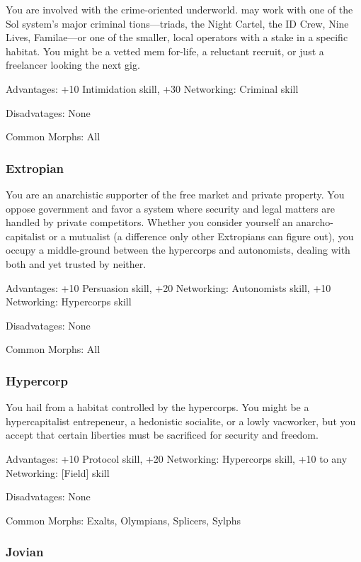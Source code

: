 You are involved with the crime-oriented underworld. may work with one of the Sol system’s major criminal tions—triads, the Night Cartel, the ID Crew, Nine Lives, Familae—or one of the smaller, local operators with a stake in a specific habitat. You might be a vetted mem for-life, a reluctant recruit, or just a freelancer looking the next gig.

Advantages: +10 Intimidation skill, +30 Networking: Criminal skill

Disadvatages: None

Common Morphs: All

\subsubsection{Extropian}
\label{sec:extropian}

You are an anarchistic supporter of the free market and private property. You oppose government and favor a system where security and legal matters are handled by private competitors. Whether you consider yourself an anarcho-capitalist or a mutualist (a difference only other Extropians can figure out), you occupy a middle-ground between the hypercorps and autonomists, dealing with both and yet trusted by neither.

Advantages: +10 Persuasion skill, +20 Networking: Autonomists skill, +10 Networking: Hypercorps skill

Disadvatages: None

Common Morphs: All

\subsubsection{Hypercorp}
\label{sec:hypercorp}

You hail from a habitat controlled by the hypercorps. You might be a hypercapitalist entrepeneur, a hedonistic socialite, or a lowly vacworker, but you accept that certain liberties must be sacrificed for security and freedom.

Advantages: +10 Protocol skill, +20 Networking: Hypercorps skill, +10 to any Networking: [Field] skill

Disadvatages: None

Common Morphs: Exalts, Olympians, Splicers, Sylphs %

\subsubsection{Jovian}
\label{sec:jovian}

